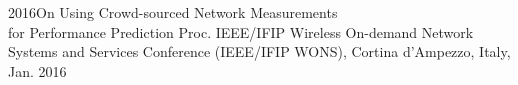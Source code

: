 \documentclass[]{friggeri-cv}
\begin{document}
	\begin{entrylist}
	\entry
	{2016}{On Using Crowd-sourced Network Measurements \\for Performance
	Prediction}{ }
	{Proc. IEEE/IFIP Wireless On-demand Network Systems and Services Conference (IEEE/IFIP WONS), Cortina d'Ampezzo, Italy, Jan. 2016}
	\end{entrylist}


	
\end{document}
